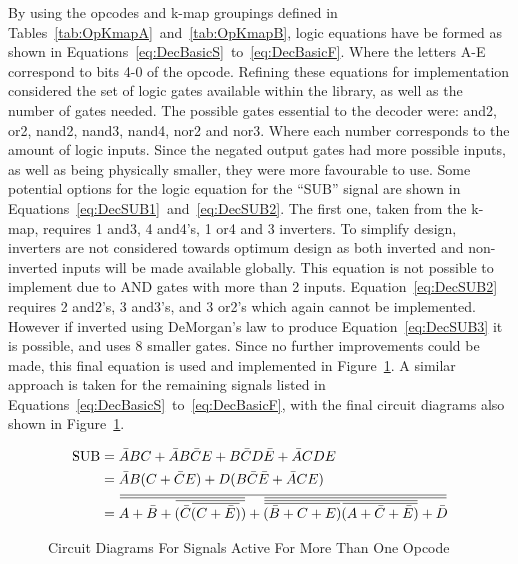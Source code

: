 By using the opcodes and k-map groupings defined in Tables~\ref{tab:OpKmapA}~and~\ref{tab:OpKmapB}, logic equations have be formed as shown in Equations~\ref{eq:DecBasicS}~to~\ref{eq:DecBasicF}. Where the letters A-E correspond to bits 4-0 of the opcode. Refining these equations for implementation considered the set of logic gates available within the library, as well as the number of gates needed. The possible gates essential to the decoder were: and2, or2, nand2, nand3, nand4, nor2 and nor3. Where each number corresponds to the amount of logic inputs. Since the negated output gates had more possible inputs, as well as being physically smaller, they were more favourable to use. Some potential options for the logic equation for the ``SUB'' signal are shown in Equations~\ref{eq:DecSUB1}~and~\ref{eq:DecSUB2}. The first one, taken from the k-map, requires 1 and3, 4 and4's, 1 or4 and 3 inverters. To simplify design, inverters are not considered towards optimum design as both inverted and non-inverted inputs will be made available globally. This equation is not possible to implement due to AND gates with more than 2 inputs. Equation~\ref{eq:DecSUB2} requires 2 and2's, 3 and3's, and 3 or2's which again cannot be implemented. However if inverted using DeMorgan's law to produce Equation~\ref{eq:DecSUB3} it is possible, and uses 8 smaller gates. Since no further improvements could be made, this final equation is used and implemented in Figure~\ref{fig:DecMultiCirs}. A similar approach is taken for the remaining signals listed in Equations~\ref{eq:DecBasicS}~to~\ref{eq:DecBasicF}, with the final circuit diagrams also shown in Figure~\ref{fig:DecMultiCirs}. 

\newcommand{\overbar}[1]{\mkern 1.5mu\overline{\mkern-1.5mu#1\mkern-1.5mu}\mkern 1.5mu}
\begin{align}
	\text{SUB} &= \bar{A}BC + \bar{A}B\bar{C}E + B\bar{C}D\bar{E} + \bar{A}CDE \label{eq:DecSUB1}\\
	&= \bar{A}B(C + \bar{C}E) + D(B\bar{C}\bar{E} + \bar{A}CE) \label{eq:DecSUB2}\\
	&= \overbar{\overbar{A + \bar{B} + \overbar{(\bar{C}\overbar{(C + \bar{E})})}} + \overbar{\overbar{\overbar{(\bar{B} + C + E)}\overbar{(A + \bar{C} + \bar{E})}} + \bar{D}}} \label{eq:DecSUB3}
\end{align}

\begin{figure}[h]
	\caption{Circuit Diagrams For Signals Active For More Than One Opcode}
	\label{fig:DecMultiCirs}
\end{figure}

